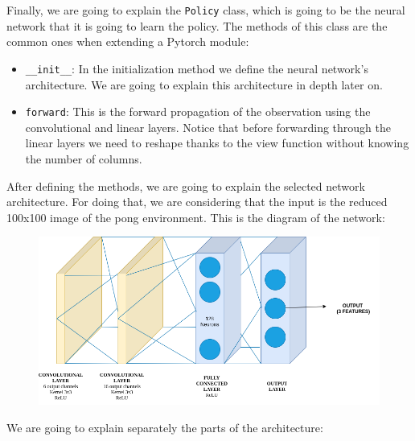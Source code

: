 \documentclass[12pt]{article}
\begin{document}
Finally, we are going to explain the \texttt{Policy} class, which is going to be the neural network that it is going to learn the policy. The methods of this class are the common ones when extending a Pytorch module:

\begin{itemize}
    \item \texttt{\_\_init\_\_}: In the initialization method we define the neural network's architecture. We are going to explain this architecture in depth later on.
    \item \texttt{forward}: This is the forward propagation of the observation using the convolutional and linear layers. Notice that before forwarding through the linear layers we need to reshape thanks to the view function without knowing the number of columns.
\end{itemize}

After defining the methods, we are going to explain the selected network architecture. For doing that, we are considering that the input is the reduced 100x100 image of the pong environment. This is the diagram of the network: \\

\begin{figure}[h]
    \centering
    \includegraphics[scale=0.3]{Untitled Diagram (1).png}
    \label{fig:my_label}
\end{figure}

We are going to explain separately the parts of the architecture:
\end{document}
